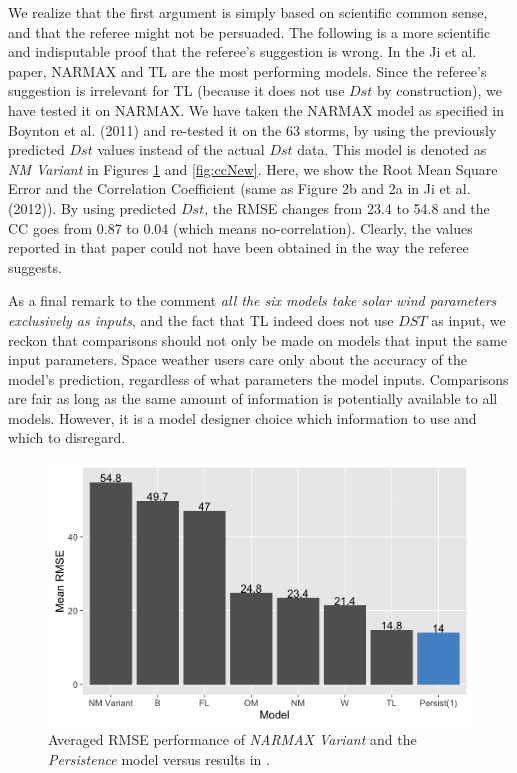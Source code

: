 \documentclass{article}
\begin{document}
\begin{enumerate}
We realize that the first argument is simply based on scientific common sense, and that the referee might not be persuaded. The following is a more scientific and indisputable proof that the referee's suggestion is wrong.
In the Ji et al. paper, NARMAX and TL are the most performing models. Since the referee's suggestion is irrelevant for TL (because it does not use $Dst$ by construction), we have tested it on NARMAX.
We have taken the NARMAX model as specified in Boynton et al. (2011) and re-tested it on the 63 storms, by using the previously predicted $Dst$ values instead of the actual $Dst$ data. This model is denoted as \emph{NM Variant} in
Figures \ref{fig:rmseNew} and \ref{fig:ccNew}. Here, we show the Root Mean Square Error and the Correlation Coefficient (same as Figure 2b and 2a in Ji et al. (2012)). By using predicted $Dst$, the RMSE changes from 23.4 to 54.8 and the CC goes from 0.87 to 0.04 (which means no-correlation). 
Clearly, the values reported in that paper could not have been obtained in the way the referee suggests. 

As a final remark to the comment \emph{all the six models take solar wind parameters exclusively as inputs}, and the fact that TL indeed does not use $DST$ as input, we reckon that comparisons should not only be made on models that input the same input parameters. Space weather users care only about the accuracy of the model’s prediction, regardless of what parameters the model inputs. Comparisons are fair as long as the same amount of information is potentially available to all models. However, it is a model designer choice which information to use and which to disregard.

\begin{figure}[h]
   \centering
   \includegraphics[width=\textwidth]{Compare_RMSE_New.png}
      \caption{
      Averaged RMSE performance of \emph{NARMAX Variant} and the 
      \emph{Persistence} model versus results in \cite{Ji2012}.
      }
      \label{fig:rmseNew}
\end{figure}


\end{enumerate}
\end{document}
